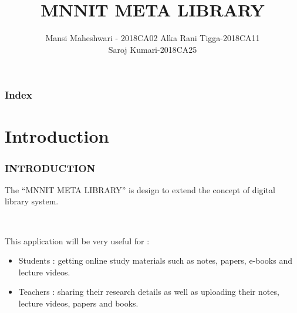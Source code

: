 \documentclass{beamer}
\begin{document}
\title[META-LIBRARY]{MNNIT META LIBRARY}
\author[\insertframenumber\ of \inserttotalframenumber \hspace{18mm} Mansi,Alka,Saroj
]{\large{Mansi Maheshwari - 2018CA02} \hspace{50mm} \textsc\large{Alka Rani Tigga-2018CA11} \\\textsc\large{Saroj Kumari-2018CA25}}


\begin{frame}
\titlepage
\usepackage{fontspec}
\end{frame}


\begin{frame}[allowframebreaks=0.80]\frametitle{Index}
\tableofcontents
\end{frame}

\section{Introduction}
\begin{frame}\frametitle{INTRODUCTION}
 \begin{block}{}
 	\begin{center}
 	{\textrm The  “MNNIT META LIBRARY”  is design to extend the concept of digital library system.} 
 	\end{center} \\
 	{\textrm This application will be very useful for : \begin{itemize}
\item Students : getting online study materials such as notes, papers, e-books and lecture videos.
\item Teachers : sharing their research details as well as uploading their notes, lecture videos, papers and books.
\end{itemize}}
\end{block}
\end{frame}
\end{document}
